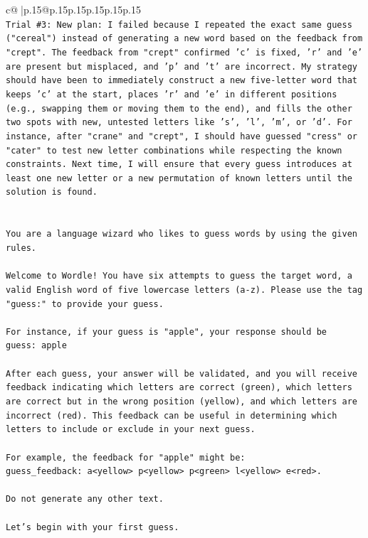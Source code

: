 \documentclass{article}
\begin{document}
{\begin{supertabular}{c@{$\;$}|p{.15\linewidth}@{}p{.15\linewidth}p{.15\linewidth}p{.15\linewidth}p{.15\linewidth}p{.15\linewidth}}
{{{\\ 
\texttt{Trial \#3: New plan: I failed because I repeated the exact same guess ("cereal") instead of generating a new word based on the feedback from "crept". The feedback from "crept" confirmed 'c' is fixed, 'r' and 'e' are present but misplaced, and 'p' and 't' are incorrect. My strategy should have been to immediately construct a new five{-}letter word that keeps 'c' at the start, places 'r' and 'e' in different positions (e.g., swapping them or moving them to the end), and fills the other two spots with new, untested letters like 's', 'l', 'm', or 'd'. For instance, after "crane" and "crept", I should have guessed "cress" or "cater" to test new letter combinations while respecting the known constraints. Next time, I will ensure that every guess introduces at least one new letter or a new permutation of known letters until the solution is found.} \\
\\ 
\\ 
\texttt{You are a language wizard who likes to guess words by using the given rules.} \\
\\ 
\texttt{Welcome to Wordle! You have six attempts to guess the target word, a valid English word of five lowercase letters (a{-}z). Please use the tag "guess:" to provide your guess.} \\
\\ 
\texttt{For instance, if your guess is "apple", your response should be} \\
\texttt{guess: apple} \\
\\ 
\texttt{After each guess, your answer will be validated, and you will receive feedback indicating which letters are correct (green), which letters are correct but in the wrong position (yellow), and which letters are incorrect (red). This feedback can be useful in determining which letters to include or exclude in your next guess.} \\
\\ 
\texttt{For example, the feedback for "apple" might be:} \\
\texttt{guess\_feedback: a<yellow> p<yellow> p<green> l<yellow> e<red>.} \\
\\ 
\texttt{Do not generate any other text.} \\
\\ 
\texttt{Let's begin with your first guess.} \\
            }
        }
    }
     \\ \\


\end{supertabular}}
\end{document}
